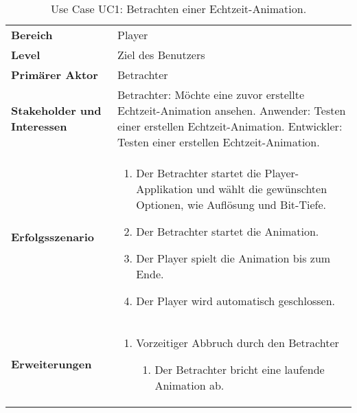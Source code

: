 
\begin{table}[H]
    \centering
    \caption{Use Case UC1: Betrachten einer Echtzeit-Animation.}\label{table:uc1-watch-demo}
    \begin{tabular}{p{}p{}}
        \toprule
            \textbf{Bereich} &
            Player\\
        \cmidrule(r){1-1}\cmidrule(lr){2-2}
            \textbf{Level} &
            Ziel des Benutzers \\
        \cmidrule(r){1-1}\cmidrule(lr){2-2}
            \textbf{Primärer Aktor} &
            Betrachter \\
        \cmidrule(r){1-1}\cmidrule(lr){2-2}
            \textbf{Stakeholder und Interessen} &
            Betrachter: Möchte eine zuvor erstellte Echtzeit-Animation ansehen.  \newline
            Anwender: Testen einer erstellen Echtzeit-Animation. \newline
            Entwickler: Testen einer erstellen Echtzeit-Animation. \\
        \cmidrule(r){1-1}\cmidrule(lr){2-2}
            \textbf{Erfolgsszenario} &
            \begin{enumerate}
                \item{Der Betrachter startet die Player-Applikation und wählt
                        die gewünschten Optionen, wie Auflösung und Bit-Tiefe.}
                \item{Der Betrachter startet die Animation.}
                \item{Der Player spielt die Animation bis zum Ende.}
                \item{Der Player wird automatisch geschlossen.}
            \end{enumerate} \\
        \cmidrule(r){1-1}\cmidrule(lr){2-2}
            \textbf{Erweiterungen} &
            \begin{enumerate}[label= (\alph*)]
                \item{Vorzeitiger Abbruch durch den Betrachter
                    \begin{enumerate}[label= (\roman*)]
                            \item{Der Betrachter bricht eine laufende Animation
                                    ab.}

\end{enumerate}}
\end{enumerate}
\end{tabular}
\end{table}
